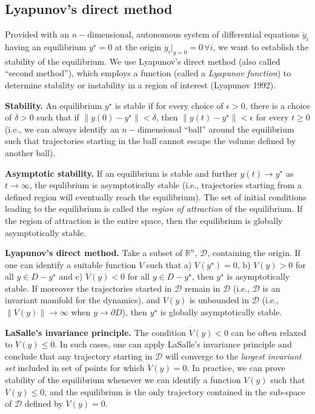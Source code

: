 \documentclass{article}
\begin{document}
\hypertarget{lyapunovs-direct-method}{%
\subsection{Lyapunov's direct method}\label{lyapunovs-direct-method}}

Provided with an \(n-\)dimensional, autonomous system of differential
equations \(\dot{y}_i\) having an equilibrium \(y^\star = 0\) at the
origin \(\dot{y_i}|_{y = 0} = 0 \, \forall i\), we want to establish the
stability of the equilibrium. We use Lyapunov's direct method (also
called ``second method''), which employs a function (called a
\emph{Lyapunov function}) to determine stability or instability in a
region of interest (Lyapunov 1992).

\textbf{Stability.} An equilibrium \(y^\star\) is stable if for every
choice of \(\epsilon > 0\), there is a choice of \(\delta > 0\) such
that if \(\lVert y(0) - y^\star \rVert < \delta\), then
\(\lVert y(t) - y^\star \rVert < \epsilon\) for every \(t \geq 0\)
(i.e., we can always identify an \(n-\)dimensional ``ball'' around the
equilibrium such that trajectories starting in the ball cannot escape
the volume defined by another ball).

\textbf{Asymptotic stability.} If an equilibrium is stable and further
\(y(t) \to y^\star\) as \(t \to \infty\), the equlibrium is
asymptotically stable (i.e., trajectories starting from a defined region
will eventually reach the equilibrium). The set of initial conditions
leading to the equilibrium is called the \emph{region of attraction} of
the equilibrium. If the region of attraction is the entire space, then
the equilibrium is globally asymptotically stable.

\textbf{Lyapunov's direct method.} Take a subset of \(\mathbb R^n\),
\(\mathcal D\), containing the origin. If one can identify a suitable
function \(V\) such that a) \(V(y^\star) = 0\), b) \(V(y) > 0\) for all
\(y \in D - y^\star\) and c) \(\dot{V}(y) <0\) for all
\(y \in D - y^\star\), then \(y^\star\) is asymptotically stable. If
moreover the trajectories started in \(\mathcal D\) remain in
\(\mathcal D\) (i.e., \(\mathcal D\) is an invariant manifold for the
dynamics), and \(V(y)\) is unbounded in \(\mathcal D\) (i.e.,
\(\lVert V(y) \rVert \to \infty\) when \(y \to \partial D\)), then
\(y^\star\) is globally asymptotically stable.

\textbf{LaSalle's invariance principle.} The condition
\(\dot{V}(y) < 0\) can be often relaxed to \(\dot{V}(y) \leq 0\). In
such cases, one can apply LaSalle's invariance principle and conclude
that any trajectory starting in \(\mathcal D\) will converge to the
\emph{largest invariant set} included in set of points for which
\(\dot{V}(y) = 0\). In practice, we can prove stability of the
equilibrium whenever we can identify a function \(V(y)\) such that
\(\dot{V}(y) \leq 0\), and the equilibrium is the only trajectory
contained in the sub-space of \(\mathcal D\) defined by
\(\dot{V}(y) = 0\).
\end{document}
